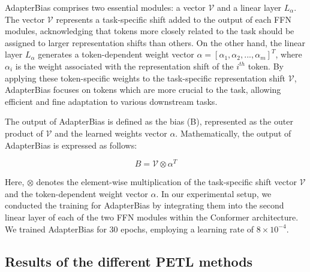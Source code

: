 AdapterBias comprises two essential modules: a vector $\mathcal{V}$ and a linear layer $L_\alpha$. The vector $\mathcal{V}$ represents a task-specific shift added to the output of each \ac{FFN} modules, acknowledging that tokens more closely related to the task should be assigned to larger representation shifts than others. On the other hand, the linear layer $L_\alpha$ generates a token-dependent weight vector $\alpha = [\alpha_1, \alpha_2, ..., \alpha_m]^T$, where $\alpha_i$ is the weight associated with the representation shift of the $i^{th}$ token. By applying these token-specific weights to the task-specific representation shift $\mathcal{V}$, AdapterBias focuses on tokens which are more crucial to the task, allowing efficient and fine adaptation to various downstream tasks.

The output of AdapterBias is defined as the bias (B), represented as the outer product of $\mathcal{V}$ and the learned weights vector $\alpha$. Mathematically, the output of AdapterBias is expressed as follows:

\begin{equation}
    B = \mathcal{V} \otimes \alpha^T    
\end{equation}

Here, \(\otimes\) denotes the element-wise multiplication of the task-specific shift vector \(\mathcal{V}\) and the token-dependent weight vector \(\alpha\).
In our experimental setup, we conducted the training for AdapterBias by integrating them into the second linear layer of each of the two \ac{FFN} modules within the Conformer architecture. We trained AdapterBias for 30 epochs, employing a learning rate of $8 \times 10^{-4}$.

\subsection{Results of the different PETL methods}

